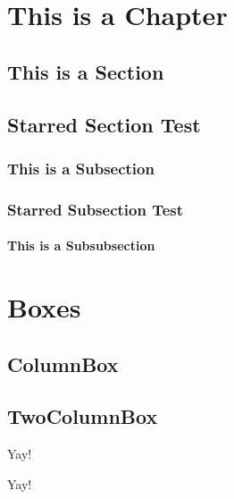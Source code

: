 \documentclass{ShadowTeXSR5}
\author{Me}
\begin{document}
\srmaketitle
\tableofcontents


\chapter{This is a Chapter}
\lipsum
\lipsum
\section{This is a Section}
\lipsum[1]
\section*{Starred Section Test}
\lipsum[2]
\subsection{This is a Subsection}
\lipsum[2-5]
\subsection*{Starred Subsection Test}
\lipsum[1-4]
\subsubsection{This is a Subsubsection}
\lipsum
\chapter{Boxes}
\lipsum
\lipsum
\section{ColumnBox}
\lipsum[1]
\begin{columnbox}[l]
\lipsum[1]
\end{columnbox}
\section{TwoColumnBox}
\lipsum
\begin{twocolbox}
\centering\Huge Yay!\\
\normalsize\lipsum[1-3]
\end{twocolbox}
\lipsum
\begin{twocolbox}
\centering\Huge Yay!\\
\normalsize\lipsum[1-3]
\end{twocolbox}
\lipsum
\lipsum
\lipsum
\end{document}
